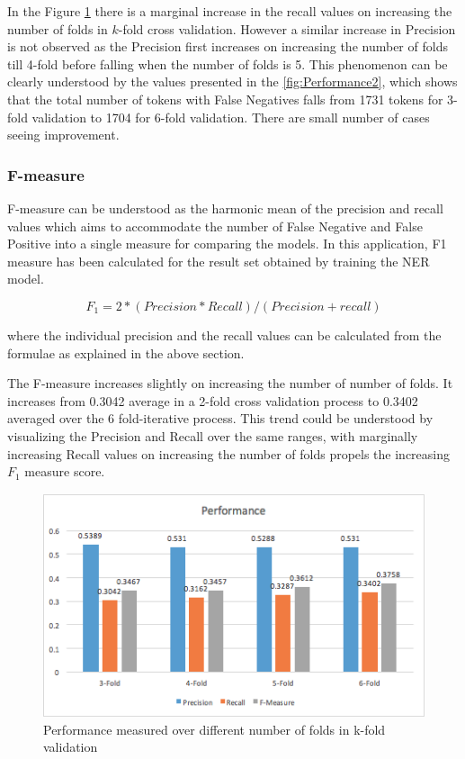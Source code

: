 \documentclass{sig-alternate-05-2015}
\begin{document}
In the Figure \ref{fig:Performance1} there is a marginal increase in the recall values on increasing the number of folds in $k$-fold cross validation. However a similar increase in Precision is not observed as the Precision first increases on increasing the number of folds till 4-fold before falling when the number of folds is 5. This phenomenon can be clearly understood by the values presented in the \ref{fig:Performance2}, which shows that the total number of tokens with False Negatives falls from 1731 tokens for 3-fold validation to 1704 for 6-fold validation. There are small number of cases seeing improvement.


\subsubsection{F-measure}
F-measure can be understood as the harmonic mean of the precision and recall values which aims to accommodate the number of False Negative and False Positive into a single measure for comparing the models. In this application, F1 measure has been calculated for the result set obtained by training the NER model.

\begin{equation}
F_1 = 2*(Precision*Recall)/(Precision+recall)
\end{equation}

where the individual precision and the recall values can be calculated from the formulae as explained in the above section.

The F-measure increases slightly on increasing the number of number of folds. It increases from 0.3042 average in a 2-fold cross validation process to 0.3402 averaged over the 6 fold-iterative process. This trend could be understood by visualizing the Precision and Recall over the same ranges, with marginally increasing Recall values on increasing the number of folds propels the increasing $F_1$ measure score.

\begin{figure}
\centering
  \includegraphics[width=\linewidth]{Performance1.png}
  \caption{Performance measured over different number of folds in k-fold validation}
  \label{fig:Performance1}
\end{figure}
\end{document}
